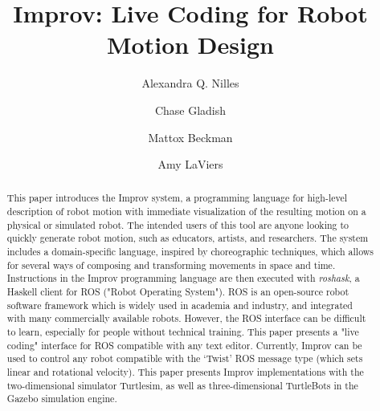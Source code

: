 \documentclass[sigchi-a]{acmart}
\begin{document}
\title{Improv: Live Coding for Robot Motion Design}

\author{Alexandra Q. Nilles}

\author{Chase Gladish}

\author{Mattox Beckman}

\author{Amy LaViers}


\renewcommand{\shortauthors}{A. Nilles et al.}


\begin{abstract}
This paper introduces the Improv system, a programming language for high-level
description of robot motion with immediate visualization of the
resulting motion on a physical or simulated robot. The intended users of this
tool are anyone looking to quickly generate robot motion, such as educators,
artists, and researchers. The system includes a domain-specific language,
inspired by choreographic techniques, which allows for several ways of composing
and transforming movements in space and time. Instructions in the Improv programming language
are then executed with \emph{roshask}, a Haskell client for ROS ("Robot Operating
System"). ROS is an open-source robot software framework which is widely used in
academia and industry, and integrated with many commercially available robots.
However, the ROS interface can be difficult to learn, especially for people
without technical training. This paper presents a "live coding" interface for
ROS compatible with any text editor. Currently, Improv can be used to control any robot compatible with the
`Twist' ROS message type (which sets linear and rotational velocity). This paper
presents Improv implementations with the two-dimensional simulator
Turtlesim, as well as three-dimensional TurtleBots in the Gazebo simulation
engine.
\end{abstract}
\end{document}
